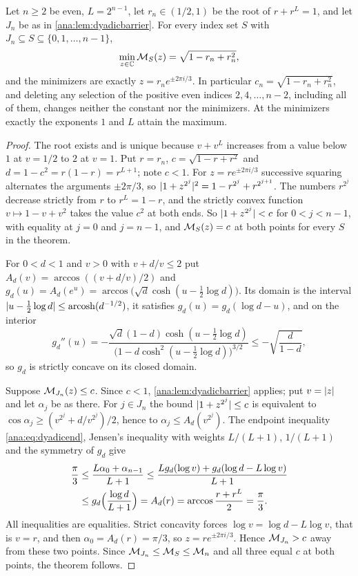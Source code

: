 \begin{theorem}\label{ana:thm:dyadiceven}
Let $n\ge2$ be even, $L=2^{n-1}$, let $r_n\in(1/2,1)$ be the root of $r+r^L=1$, and let $J_n$
be as in \cref{ana:lem:dyadicbarrier}. For every index set $S$ with
$J_n\subseteq S\subseteq\{0,1,\dots,n-1\}$,
\[
 \min_{z\in\mathbb{C}}\mathcal{M}_S(z)=\sqrt{1-r_n+r_n^2},
\]
and the minimizers are exactly $z=r_ne^{\pm2\pi i/3}$. In particular
$c_n=\sqrt{1-r_n+r_n^2}$, and deleting any selection of the positive even indices
$2,4,\dots,n-2$, including all of them, changes neither the constant nor the minimizers. At
the minimizers exactly the exponents $1$ and $L$ attain the maximum.
\end{theorem}

\begin{proof}
The root exists and is unique because $v+v^L$ increases from a value below $1$ at $v=1/2$
to $2$ at $v=1$. Put $r=r_n$, $c=\sqrt{1-r+r^2}$ and $d=1-c^2=r(1-r)=r^{L+1}$; note $c<1$.
For $z=re^{\pm2\pi i/3}$ successive squaring alternates the arguments $\pm2\pi/3$, so
$\lvert1+z^{2^j}\rvert^2=1-r^{2^j}+r^{2^{j+1}}$. The numbers $r^{2^j}$ decrease strictly from $r$
to $r^L=1-r$, and the strictly convex function $v\mapsto1-v+v^2$ takes the value $c^2$ at
both ends. So $\lvert1+z^{2^j}\rvert<c$ for $0<j<n-1$, with equality at $j=0$ and $j=n-1$, and
$\mathcal{M}_S(z)=c$ at both points for every $S$ in the theorem.

For $0<d<1$ and $v>0$ with $v+d/v\le2$ put $A_d(v)=\arccos((v+d/v)/2)$ and
$g_d(u)=A_d(e^u)=\arccos\bigl(\sqrt d\cosh(u-\tfrac12\log d)\bigr)$. Its domain is the
interval $\lvert u-\frac12\log d\rvert\le\operatorname{arcosh}(d^{-1/2})$, it satisfies
$g_d(u)=g_d(\log d-u)$, and on the interior
\begin{equation}\label{ana:eq:gconc}
 g_d''(u)=-\frac{\sqrt d(1-d)\cosh(u-\frac12\log d)}
 {\bigl(1-d\cosh^2(u-\frac12\log d)\bigr)^{3/2}}\le-\sqrt{\frac d{1-d}},
\end{equation}
so $g_d$ is strictly concave on its closed domain.

Suppose $\mathcal{M}_{J_n}(z)\le c$. Since $c<1$, \cref{ana:lem:dyadicbarrier} applies; put
$v=\lvert z\rvert$ and let $\alpha_j$ be as there. For $j\in J_n$ the bound $\lvert1+z^{2^j}\rvert\le c$ is
equivalent to $\cos\alpha_j\ge(v^{2^j}+d/v^{2^j})/2$, hence to $\alpha_j\le A_d(v^{2^j})$.
The endpoint inequality \eqref{ana:eq:dyadicend}, Jensen's inequality with weights
$L/(L+1)$, $1/(L+1)$ and the symmetry of $g_d$ give
\begin{align*}
 \frac\pi3&\le\frac{L\alpha_0+\alpha_{n-1}}{L+1}\le\frac{Lg_d(\log v)+g_d(\log d-L\log v)}{L+1}\\
 &\le g_d\Bigl(\frac{\log d}{L+1}\Bigr)=A_d(r)=\arccos\frac{r+r^L}2=\frac\pi3 .
\end{align*}
All inequalities are equalities. Strict concavity forces $\log v=\log d-L\log v$, that is
$v=r$, and then $\alpha_0=A_d(r)=\pi/3$, so $z=re^{\pm2\pi i/3}$. Hence $\mathcal{M}_{J_n}>c$ away
from these two points. Since $\mathcal{M}_{J_n}\le\mathcal{M}_S\le\mathcal{M}_n$ and all three equal $c$ at
both points, the theorem follows.
\end{proof}

